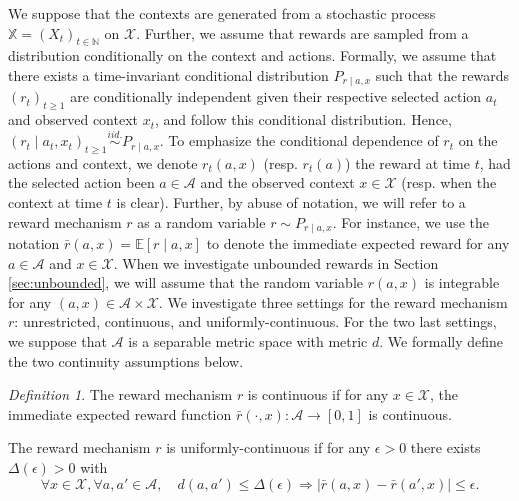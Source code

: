 \documentclass[aos]{imsart}
\theoremstyle{plain}
\theoremstyle{remark}
\newtheorem{definition}[theorem]{Definition}
\newcommand{\Acal}{\mathcal{A}}
\newcommand{\Xcal}{\mathcal{X}}
\newcommand{\Ebb}{\mathbb{E}}
\newcommand{\Xbb}{\mathbb{X}}
\newcommand{\1}{\mathbbm{1}}%
\newcommand{\nats}{\mathbb{N}}
\begin{document}
We suppose that the contexts are generated from a stochastic process $\Xbb=(X_t)_{t \in \nats}$ on $\Xcal$. Further, we assume that rewards are sampled from a distribution conditionally on the context and actions. Formally, we assume that there exists a time-invariant conditional distribution $P_{r\mid a,x}$ such that the rewards $(r_t)_{t\geq 1}$ are conditionally independent given their respective selected action $a_t$ and observed context $x_t$, and follow this conditional distribution. Hence, $(r_t\mid a_t,x_t)_{t\geq 1}\overset{iid.}{\sim}P_{r\mid a,x}$. To emphasize the conditional dependence of $r_t$ on the actions and context, we denote $r_t(a,x)$ (resp. $r_t(a)$) the reward at time $t$, had the selected action been $a\in\Acal$ and the observed context $x\in \Xcal$ (resp. when the context at time $t$ is clear). Further, by abuse of notation, we will refer to a reward mechanism $r$ as a random variable $r\sim P_{r\mid a,x}$. For instance, we use the notation $\bar r(a,x)= \Ebb[r\mid a,x]$ to denote the immediate expected reward for any $a\in \Acal$ and $x\in \Xcal$. When we investigate unbounded rewards in Section \ref{sec:unbounded}, we will assume that the random variable $r(a, x)$ is integrable for any $(a,x)\in\Acal\times\Xcal$. We investigate three settings for the reward mechanism $r$: unrestricted, continuous, and uniformly-continuous. For the two last settings, we suppose that $\Acal$ is a separable metric space with metric $d$. We formally define the two continuity assumptions below.
\begin{definition}\label{def:continuous+unif_cont_rewards}
    The reward mechanism $r$ is continuous if for any $x\in\Xcal$, the immediate expected reward function $\bar r(\cdot, x):\Acal\to[0,1]$ is continuous.
    
    \noindent The reward mechanism $r$ is uniformly-continuous if for any $\epsilon>0$ there exists $\Delta(\epsilon)>0$ with
\begin{equation*}
    \forall x \in\Xcal,\forall a,a'\in \Acal,
    \quad d(a,a') \leq \Delta(\epsilon)\Rightarrow |\bar r(a, x)-\bar r(a', x) |\leq \epsilon.
\end{equation*}
\end{definition}
\end{document}

